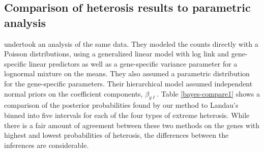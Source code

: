 \subsection{Comparison of heterosis results to parametric analysis}

\citet{landau2016high} undertook an analysis of the same data. They modeled the counts directly with a Poisson distributions, using a generalized linear model with log link and gene-specific linear predictors as well as a gene-specific variance parameter for a lognormal mixture on the means. They also assumed a parametric distribution for the gene-specific parameters. Their hierarchical model assumed independent normal priors on the coefficient components, $\beta_{g\ell}$. Table \ref{bayes-compare1} shows a comparison of the posterior probabilities found by our method to Landau's binned into five intervals for each of the four types of extreme heterosis. While there is a fair amount of agreement between these two methods on the genes with highest and lowest probabilities of heterosis, the differences between the inferences are considerable.

